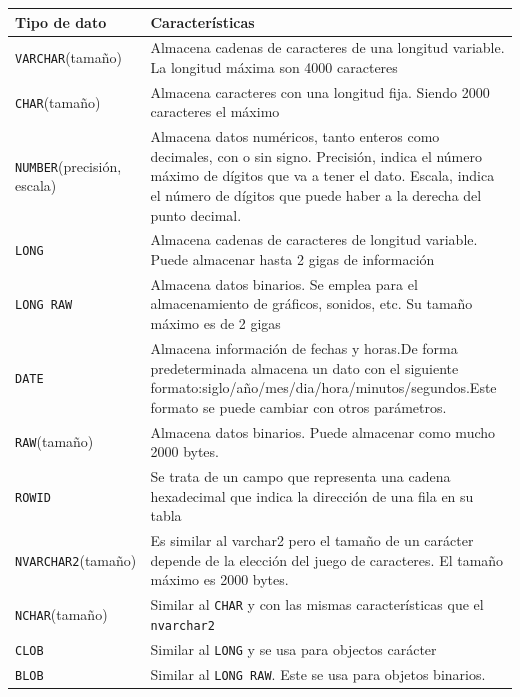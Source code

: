\begin{center}
  \scriptsize	
  \label{tablaTipoDatos1} %
  \renewcommand{\arrayrulewidth}{1pt}
\begin{tabular}{|p{40mm}|p{98mm}|}\hline
\textbf{Tipo de dato} & \textbf{Caracter\'isticas}\\\hline
\texttt{VARCHAR}(tama\~no) & Almacena cadenas de caracteres de una longitud variable.
La longitud m\'axima son 4000 caracteres \\\hline
\texttt{CHAR}(tama\~no)&
Almacena caracteres con una longitud fija. Siendo 2000 caracteres el máximo\\\hline
\texttt{NUMBER}(precisi\'on, escala) &
Almacena datos num\'ericos, tanto enteros como decimales, con o sin signo. Precisi\'on, indica el n\'umero m\'aximo de d\'igitos que va a tener el dato. Escala, indica el n\'umero de d\'igitos que puede haber a la derecha del punto decimal.\\\hline
\texttt{LONG}&
Almacena cadenas de caracteres de longitud variable. Puede almacenar hasta 2 gigas de informaci\'on\\\hline
\texttt{LONG RAW}&
Almacena datos binarios. Se emplea para el almacenamiento de gr\'aficos, sonidos, etc. Su tamaño m\'aximo es de 2 gigas\\\hline
\texttt{DATE} &
Almacena informaci\'on de fechas y horas.De forma predeterminada almacena un dato con el siguiente formato:siglo/a\~no/mes/dia/hora/minutos/segundos.Este formato se puede cambiar con otros par\'ametros.\\\hline
\texttt{RAW}(tama\~no)&
Almacena datos binarios. Puede almacenar como mucho 2000 bytes.\\\hline
\texttt{ROWID}&
Se trata de un campo que representa una cadena hexadecimal que indica la direcci\'on de una fila en su tabla\\\hline
\texttt{NVARCHAR2}(tama\~no)&
Es similar al varchar2 pero el tama\~no de un car\'acter depende de la elecci\'on del juego de caracteres. El tama\~no m\'aximo es 2000 bytes.\\\hline
\texttt{NCHAR}(tama\~no)&
Similar al \texttt{CHAR} y con las mismas caracter\'isticas que el \texttt{nvarchar2}\\\hline
\texttt{CLOB}&
Similar al \texttt{LONG} y se usa para objectos car\'acter\\\hline
\texttt{BLOB} &
Similar al \texttt{LONG RAW}. Este se usa para objetos binarios.\\\hline
\end{tabular}
\end{center}
